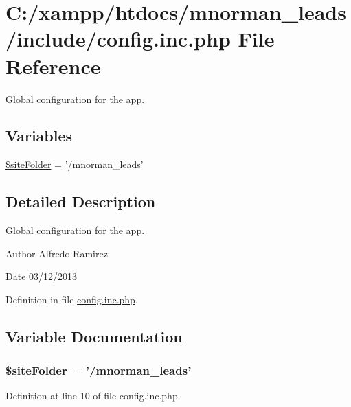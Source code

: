 \hypertarget{config_8inc_8php}{\section{C\-:/xampp/htdocs/mnorman\-\_\-leads/include/config.inc.\-php File Reference}
\label{config_8inc_8php}
}


Global configuration for the app.  


\subsection*{Variables}
\begin{DoxyCompactItemize}
\item 
\hyperlink{config_8inc_8php_a9da44bec0697e24490415c8a3b4ba382}{\$site\-Folder} = '/mnorman\-\_\-leads'
\end{DoxyCompactItemize}


\subsection{Detailed Description}
Global configuration for the app. \begin{DoxyAuthor}{Author}
Alfredo Ramirez 
\end{DoxyAuthor}
\begin{DoxyDate}{Date}
03/12/2013 
\end{DoxyDate}


Definition in file \hyperlink{config_8inc_8php_source}{config.\-inc.\-php}.



\subsection{Variable Documentation}
\hypertarget{config_8inc_8php_a9da44bec0697e24490415c8a3b4ba382}{
\subsubsection[{\$site\-Folder}]{\setlength{\rightskip}{0pt plus 5cm}\$site\-Folder = '/mnorman\-\_\-leads'}}\label{config_8inc_8php_a9da44bec0697e24490415c8a3b4ba382}


Definition at line 10 of file config.\-inc.\-php.

